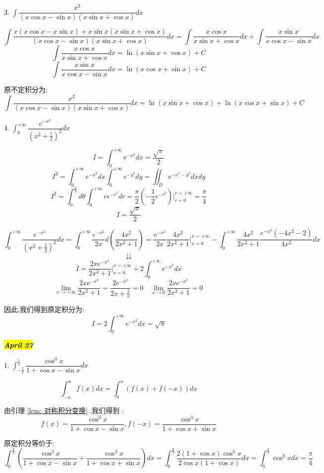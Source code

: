 
3. $\int\dfrac{x^2}{(x\cos x-\sin x)(x\sin x+\cos x)}dx$
\begin{solution}
	
	$$\int\frac{x(x\cos x-x\sin x)+x\sin x(x\sin x+\cos x)}{(x\cos x-\sin x)(x\sin x+\cos x)}dx=\int\frac{x\cos x}{x\sin x+\cos x}dx+\int\frac{x\sin x}{x\cos x-\sin x}dx$$
	$$\int\frac{x\cos x}{x\sin x+\cos x}dx=\ln(x\sin x+\cos x)+C$$
	$$\int\frac{x\sin x}{x\cos x-\sin x}dx=\ln(x\cos x+\sin x)+C$$
	
	原不定积分为: 
	$$\int\frac{x^2}{(x\cos x-\sin x)(x\sin x+\cos x)}dx=\ln(x\sin x+\cos x)+\ln(x\cos x+\sin x)+C$$
\end{solution}


4. $\int_{0}^{+\infty}\dfrac{e^{-x^2}}{(x^2+\frac{1}{2})^2}dx$
\begin{lemma}[特殊积分]\label{lem: 特殊积分}
	
	$$I=\int_{0}^{+\infty}e^{-x^2}dx=\frac{\sqrt{\pi}}{2}$$
	$$I^2=\int_{0}^{+\infty}e^{-x^2}dx\int_{0}^{+\infty}e^{-y^2}dy=\iint_{D}e^{-x^2-y^2}dxdy$$
	$$I^2=\int_{0}^{\frac{\pi}{2}}d\theta\int_{0}^{+\infty}re^{-r^2}dr=\frac{\pi}{2}(-\frac{1}{2}e^{-r^2})|_{r=0}^{r=+\infty}=\frac{\pi}{4}$$
	$$I=\frac{\sqrt{\pi}}{2}$$
\end{lemma}

\begin{solution}
	$$\int_{0}^{+\infty}\frac{e^{-x^2}}{(x^2+\frac{1}{2})^2}dx=\int_{0}^{+\infty}\frac{e^{-x^2}}{2x}d(\frac{4x^2}{2x^2+1})=\frac{e^{-x^2}}{2x}\frac{4x^2}{2x^2+1}|_{x=0}^{x=+\infty}-\int_{0}^{+\infty}\frac{4x^2}{2x^2+1}\frac{e^{-x^2}(-4x^2-2)}{4x^2}dx$$
	$$\downdownarrows$$
	$$I=\frac{2xe^{-x^2}}{2x^2+1}|_{x=0}^{x=+\infty}+2\int_{0}^{+\infty}e^{-x^2}dx$$
	$$\lim\limits_{x\rightarrow +\infty}\frac{2xe^{-x^2}}{2x^2+1}=\frac{2e^{-x^2}}{2x+\frac{1}{x}}=0 \quad \lim\limits_{x\rightarrow 0}\frac{2xe^{-x^2}}{2x^2+1}=0$$
	
	因此,我们得到原定积分为: 
	$$I=2\int_{0}^{+\infty}e^{-x^2}dx=\sqrt{\pi}$$
\end{solution}

\hl{\textbf{\textit{April 27}}}

1. $\int_{-\frac{\pi}{2}}^{\frac{\pi}{2}}\dfrac{\cos^3 x}{1+\cos x-\sin x}dx$

\begin{lemma}[对称积分变换]\label{lem: 对称积分变换}
	
	$$\int_{-a}^{a}f(x)dx=\int_{0}^{a}(f(x)+f(-x))dx$$
\end{lemma}
\begin{solution}
	
	由引理 \ref{lem: 对称积分变换} ,我们得到 : 
	$$f(x)=\frac{\cos^3 x}{1+\cos x-\sin x},f(-x)=\frac{\cos^3 x}{1+\cos x+\sin x}$$
	
	原定积分等价于: 
	$$\int_{0}^{\frac{\pi}{2}}(\frac{\cos^3 x}{1+\cos x-\sin x}+\frac{\cos^3 x}{1+\cos x+\sin x})dx=\int_{0}^{\frac{\pi}{2}}\frac{2(1+\cos x)\cos^3x}{2\cos x(1+\cos x)}dx=\int_{0}^{\frac{\pi}{2}}\cos^2 xdx=\frac{\pi}{4}$$
\end{solution}

